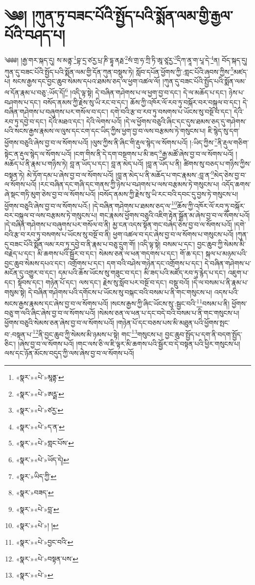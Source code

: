\chapter{༄༅། །ཀུན་ཏུ་བཟང་པོའི་སྤྱོད་པའི་སྨོན་ལམ་གྱི་རྒྱལ་པོའི་བཤད་པ།}༄༅༅། །རྒྱ་གར་སྐད་དུ། ས་མནྟ་\footnote{«སྣར་»«པེ་»མཱནྟ་}བྷ་དྲ་ཙརྱ་པྲ་ཎི་དྷཱ་ནརྠ་\footnote{«སྣར་»«པེ་»ཨཪྠ་}སཾ་གྲ་ཧ་ཀྲི་ཏི་ཨཱ་ཙཱརྱ་\footnote{«སྣར་»«པེ་»ཙརྱ་}དིཀ་ནཱ་ག་པཱ་དེ་\footnote{«སྣར་»«པེ་»ད་ན་}ན། བོད་སྐད་དུ། ཀུན་དུ་བཟང་པོའི་སྤྱོད་པའི་སྨོན་ལམ་གྱི་དོན་ཀུན་བསྡུས་ཏེ། སློབ་དཔོན་ཕྱོགས་ཀྱི་:གླང་པོའི་ཞབས་ཀྱིས་\footnote{«སྣར་»«པེ་»གླང་པོས་}མཛད་པ། སངས་རྒྱས་དང་བྱང་ཆུབ་སེམས་དཔའ་ཐམས་ཅད་ལ་ཕྱག་འཚལ་ལོ། །ཀུན་དུ་བཟང་པོའི་སྤྱོད་པའི་སྨོན་ལམ་ལ་དོན་རྣམ་པ་བཅུ་:ཡོད་དོ།\footnote{«སྣར་»«པེ་»ཡོད་དེ།} །འདི་ལྟ་སྟེ། དེ་བཞིན་གཤེགས་པ་ལ་ཕྱག་བྱ་བ་དང་། དེ་ལ་མཆོད་པ་དང་། ཉེས་པ་བཤགས་པ་དང་། བསོད་ནམས་ཀྱི་རྗེས་སུ་ཡི་རང་བ་དང་། ཆོས་ཀྱི་འཁོར་ལོ་རབ་ཏུ་བསྐོར་བར་བསྐུལ་བ་དང་། དེ་བཞིན་གཤེགས་པ་བཞུགས་པར་གསོལ་བ་དང་། དགེ་བའི་རྩ་བ་རབ་ཏུ་བསགས་པ་ཡོངས་སུ་བསྔོ་བ་དང་། དེའི་རབ་ཏུ་དབྱེ་བ་དང་། དེའི་མཐའ་དང་། དེའི་ལེགས་པའོ། །དེ་ལ་ཕྱོགས་བཅུའི་ཞིང་དང་དུས་ཐམས་ཅད་དུ་གཤེགས་པའི་སངས་རྒྱས་རྣམས་ལ་ལུས་དང་ངག་དང་ཡིད་ཀྱིས་ཕྱག་བྱ་བ་ལས་བརྩམས་ཏེ་གསུངས་པ། ཇི་སྙེད་སུ་དག་ཕྱོགས་བཅུའི་ཞེས་བྱ་བ་ལ་སོགས་པའོ། །ལུས་ཀྱིས་ནི་ཞིང་གི་རྡུལ་སྙེད་ལ་སོགས་པའོ། །:ཡིད་ཀྱིས་\footnote{«སྣར་»ཡིད་ཀྱི་}ནི་རྡུལ་གཅིག་སྟེང་ན་རྡུལ་སྙེད་ལ་སོགས་པའོ། །ངག་གིས་ནི་དེ་དག་བསྔགས་པ་མི་ཟད་\footnote{«སྣར་»བཟད་}རྒྱ་མཚོ་ཞེས་བྱ་བ་ལ་སོགས་པའོ། །མཆོད་པ་ནི་རྣམ་པ་གཉིས་ཏེ། བླ་ན་ཡོད་པ་དང་། བླ་ན་མེད་པའོ། །བླ་ན་ཡོད་པ་ནི། ཚིགས་སུ་བཅད་པ་གཉིས་ཀྱིས་བསྟན་ཏེ། མེ་ཏོག་དམ་པ་ཞེས་བྱ་བ་ལ་སོགས་པའོ། །བླ་ན་མེད་པ་ནི་མཆོད་པ་གང་རྣམས་:བླ་ན་\footnote{«སྣར་»«པེ་»བླ་}མེད་ཅེས་བྱ་བ་ལ་སོགས་པའོ། །རང་བཞིན་དང་གཞི་དང་གནས་ཀྱི་ཉེས་པ་བཤགས་པ་ལས་བརྩམས་ཏེ་གསུངས་པ། འདོད་ཆགས་ཞེ་སྡང་གཏི་མུག་ཅེས་བྱ་བ་ལ་སོགས་པའོ། །བསོད་ནམས་ཀྱི་རྗེས་སུ་ཡི་རང་བའི་དབང་དུ་བྱས་ཏེ་གསུངས་པ། ཕྱོགས་བཅུའི་ཞེས་བྱ་བ་ལ་སོགས་པའོ:། །དེ་བཞིན་གཤེགས་པ་ཐམས་ཅད་ལ་\footnote{«སྣར་»«པེ་»། །}ཆོས་ཀྱི་འཁོར་ལོ་རབ་ཏུ་བསྐོར་བར་བསྐུལ་བ་ལས་བརྩམས་ཏེ་གསུངས་པ། གང་རྣམས་ཕྱོགས་བཅུའི་འཇིག་རྟེན་སྒྲོན་མ་ཞེས་བྱ་བ་ལ་སོགས་པའོ། །དེ་བཞིན་གཤེགས་པ་བཞུགས་པར་གསོལ་བ་ནི། མྱ་ངན་འདས་སྟོན་གང་བཞེད་ཅེས་བྱ་བ་ལ་སོགས་པའོ། །དགེ་བའི་རྩ་བ་རབ་ཏུ་བསགས་པ་ཡོངས་སུ་བསྔོ་བ་ནི། ཕྱག་འཚལ་བ་དང་ཞེས་བྱ་བ་ལ་སོགས་པ་གསུངས་པའོ། །ཀུན་དུ་བཟང་པོའི་སྨོན་ལམ་རབ་ཏུ་དབྱེ་བ་ནི་རྣམ་པ་བཅུ་དྲུག་གོ། །འདི་ལྟ་སྟེ། བསམ་པ་དང་། བྱང་ཆུབ་ཀྱི་སེམས་མི་བརྗེད་པ་དང་། མི་ཆགས་པའི་སྦྱོར་བ་དང་། སེམས་ཅན་ལ་ཕན་གདགས་པ་དང་། གོ་ཆ་དང་། སྐལ་པ་མཉམ་པའི་བྱང་ཆུབ་སེམས་དཔའ་དང་། འགྲོགས་པ་དང་། དག་བའི་བཤེས་གཉེན་དང་འགྲོགས་པ་དང་། དེ་བཞིན་གཤེགས་པ་མངོན་དུ་འགྱུར་བ་དང་། དམ་པའི་ཆོས་ཡོངས་སུ་གཟུང་བ་དང་། མི་ཟད་པའི་མཛོད་རབ་ཏུ་རྙེད་པ་དང་། འཇུག་པ་དང་། སྟོབས་དང་། གཉེན་པོ་དང་། ལས་དང་། རྗེས་སུ་སློབ་པར་བསྔོ་བ་དང་། བསྡུ་བའོ། །དེ་ལ་བསམ་པ་ནི་རྣམ་པ་གསུམ་སྟེ། དེ་བཞིན་གཤེགས་པའི་དགོངས་པ་ཡོངས་སུ་བསྐང་བའི་བསམ་པ་ནི་གང་གསུངས་པ། འདས་པའི་སངས་རྒྱས་རྣམས་དང་ཞེས་བྱ་བ་ལ་སོགས་པའོ། །སངས་རྒྱས་ཀྱི་ཞིང་ཡོངས་སུ་:སྦྱང་བའི་\footnote{«སྣར་»«པེ་»བྱང་བའི་}བསམ་པ་ནི། ཕྱོགས་བཅུ་ག་ལའི་ཞིང་ཞེས་བྱ་བ་ལ་སོགས་པའོ། །སེམས་ཅན་ལ་ཕན་པ་དང་བདེ་བའི་བསམ་པ་ནི་གང་གསུངས་པ། ཕྱོགས་བཅུའི་སེམས་ཅན་ཞེས་བྱ་བ་ལ་སོགས་པའོ། །གཉེན་པོ་དང་བཅས་པས་མི་མཐུན་པའི་ཕྱོགས་སྤང་བ་:བསྟན་པ་\footnote{«སྣར་»«པེ་»བསྟན་པས་}ནི་བྱང་ཆུབ་ཀྱི་སེམས་མི་ཉམས་པ་སྟེ། གང་\footnote{«སྣར་»«པེ་»}གསུངས་པ། བྱང་ཆུབ་སྤྱོད་པ་དག་ནི་བདག་སྤྱོད་ཅིང་། །ཞེས་བྱ་བ་ལ་སོགས་པའོ། །གང་ལས་ཅི་ལ་ཇི་ལྟར་མི་ཆགས་པའི་སྦྱོར་བ་དེ་བསྟན་པའི་ཕྱིར་གསུངས་པ། ལས་དང་ཉོན་མོངས་བདུད་ཀྱི་ལས་ཞེས་བྱ་བ་ལ་སོགས་པའོ། 
